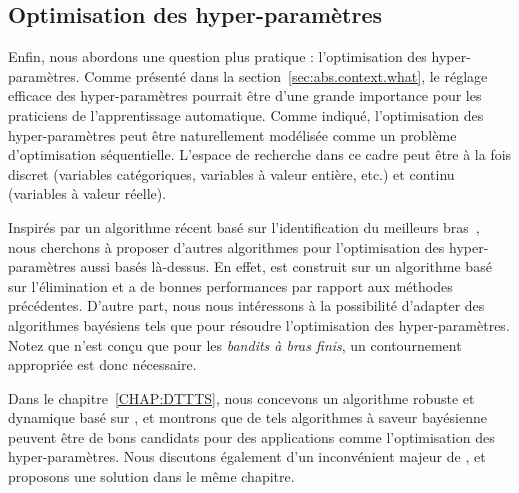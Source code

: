 
\subsection{Optimisation des hyper-param\`etres}\label{sec:abs.mab.hpo}

Enfin, nous abordons une question plus pratique : l'optimisation des hyper-paramètres. Comme présenté dans la section~\ref{sec:abs.context.what}, le réglage efficace des hyper-paramètres pourrait être d'une grande importance pour les praticiens de l'apprentissage automatique. Comme indiqué, l'optimisation des hyper-paramètres peut être naturellement modélisée comme un problème d'optimisation séquentielle. L'espace de recherche dans ce cadre peut être à la fois discret (variables catégoriques, variables à valeur entière, etc.) et continu (variables à valeur réelle). 


Inspirés par un algorithme récent \Hyperband{} basé sur l'identification du meilleurs bras~\citep{li2017hyperband}, nous cherchons à proposer d'autres algorithmes pour l'optimisation des hyper-paramètres aussi basés l\`a-dessus. En effet, \Hyperband{} est construit sur un algorithme basé sur l'élimination et a de bonnes performances par rapport aux méthodes précédentes. D'autre part, nous nous intéressons à la possibilité d'adapter des algorithmes bayésiens tels que \TTTS{} pour résoudre l'optimisation des hyper-paramètres. Notez que \TTTS{} n'est conçu que pour les \emph{bandits à bras finis}, un contournement appropriée est donc nécessaire.

Dans le chapitre~\ref{CHAP:DTTTS}, nous concevons un algorithme robuste et dynamique \DTTTS{} basé sur \TTTS{}, et montrons que de tels algorithmes à saveur bayésienne peuvent être de bons candidats pour des applications comme l'optimisation des hyper-paramètres. Nous discutons également d'un inconvénient majeur de \DTTTS{}, et proposons une solution dans le même chapitre.
